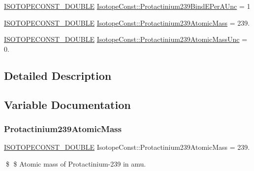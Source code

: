 \begin{DoxyCompactItemize}
\item 
\mbox{\hyperlink{group___isotope_const-_macros_ga8f45a7272ce02c0b4c65c44636ed719a}{I\+S\+O\+T\+O\+P\+E\+C\+O\+N\+S\+T\+\_\+\+D\+O\+U\+B\+LE}} \mbox{\hyperlink{group___isotope_const-_protactinium-_pa239_ga8afdc5bd8318f30ac5bc5358e7d94886}{Isotope\+Const\+::\+Protactinium239\+Bind\+E\+Per\+A\+Unc}} = 1
\item 
\mbox{\hyperlink{group___isotope_const-_macros_ga8f45a7272ce02c0b4c65c44636ed719a}{I\+S\+O\+T\+O\+P\+E\+C\+O\+N\+S\+T\+\_\+\+D\+O\+U\+B\+LE}} \mbox{\hyperlink{group___isotope_const-_protactinium-_pa239_ga1ed1c3c55a1033b68d582376ac847cb5}{Isotope\+Const\+::\+Protactinium239\+Atomic\+Mass}} = 239.
\item 
\mbox{\hyperlink{group___isotope_const-_macros_ga8f45a7272ce02c0b4c65c44636ed719a}{I\+S\+O\+T\+O\+P\+E\+C\+O\+N\+S\+T\+\_\+\+D\+O\+U\+B\+LE}} \mbox{\hyperlink{group___isotope_const-_protactinium-_pa239_ga433f3bbefc3c34da3b666735aa0fd5cb}{Isotope\+Const\+::\+Protactinium239\+Atomic\+Mass\+Unc}} = 0.
\end{DoxyCompactItemize}


\subsection{Detailed Description}


\subsection{Variable Documentation}
\mbox{\label{group___isotope_const-_protactinium-_pa239_ga1ed1c3c55a1033b68d582376ac847cb5}} 
\subsubsection{\texorpdfstring{Protactinium239\+Atomic\+Mass}{Protactinium239AtomicMass}}
{\footnotesize\ttfamily \mbox{\hyperlink{group___isotope_const-_macros_ga8f45a7272ce02c0b4c65c44636ed719a}{I\+S\+O\+T\+O\+P\+E\+C\+O\+N\+S\+T\+\_\+\+D\+O\+U\+B\+LE}} Isotope\+Const\+::\+Protactinium239\+Atomic\+Mass = 239.}

\$ \$ Atomic mass of Protactinium-\/239 in amu. \mbox{\label{group___isotope_const-_protactinium-_pa239_ga433f3bbefc3c34da3b666735aa0fd5cb}} 
